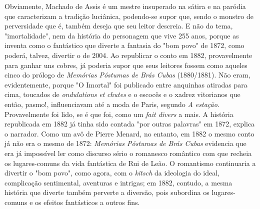 Obviamente, Machado de Assis é um mestre insuperado na sátira e na
paródia que caracterizam a tradição luciânica, podendo-se supor que,
sendo o monstro de perversidade que é, também deseja que seu leitor
descreia. E não do tema, "imortalidade", nem da história do personagem
que vive 255 anos, porque as inventa como o fantástico que diverte a
fantasia do "bom povo" de 1872, como poderá, talvez, divertir o de 2004.
Ao republicar o conto em 1882, provavelmente para ganhar uns cobres, já
poderia supor que seus leitores fossem como aqueles cinco do prólogo de
\emph{Memórias Póstumas de Brás Cubas} (1880/1881). Não eram,
evidentemente, porque "O Imortal" foi publicado entre anquinhas atiradas
para cima, toucados de \emph{ondulations} \emph{et} \emph{chutes} e o
escocês e o xadrez vitorianos que então, pasmo!, influenciavam até a
moda de Paris, segundo \emph{A estação}. Provavelmente foi lido, se é
que foi, como um \emph{fait divers} a mais. A história republicada em
1882 já tinha sido contada "por outras palavras" em 1872, explica o
narrador. Como um avô de Pierre Menard, no entanto, em 1882 o mesmo
conto já não era o mesmo de 1872: \emph{Memórias Póstumas de Brás Cubas}
evidencia que era já impossível ler como discurso sério o romanesco
romântico com que recheia os lugares-comuns da vida fantástica de Rui de
Leão. O romantismo continuaria a divertir o "bom povo", como agora, com
o \emph{kitsch} da ideologia do ideal, complicação sentimental,
aventuras e intrigas; em 1882, contudo, a mesma história que diverte
também perverte a diversão, pois subordina os lugares-comuns e os
efeitos fantásticos a outros fins.

